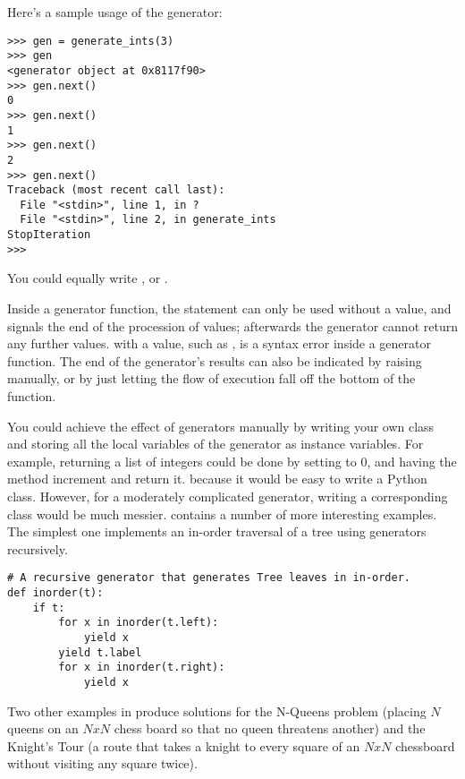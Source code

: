 \documentclass{howto}
\begin{document}
Here's a sample usage of the  generator:

\begin{verbatim}
>>> gen = generate_ints(3)
>>> gen
<generator object at 0x8117f90>
>>> gen.next()
0
>>> gen.next()
1
>>> gen.next()
2
>>> gen.next()
Traceback (most recent call last):
  File "<stdin>", line 1, in ?
  File "<stdin>", line 2, in generate_ints
StopIteration
>>>
\end{verbatim}

You could equally write , or
.

Inside a generator function, the  statement can only
be used without a value, and signals the end of the procession of
values; afterwards the generator cannot return any further values.
 with a value, such as , is a syntax
error inside a generator function.  The end of the generator's results
can also be indicated by raising  manually,
or by just letting the flow of execution fall off the bottom of the
function.

You could achieve the effect of generators manually by writing your
own class and storing all the local variables of the generator as
instance variables.  For example, returning a list of integers could
be done by setting  to 0, and having the
 method increment  and return it.
because it would be easy to write a Python class.  However, for a
moderately complicated generator, writing a corresponding class would
be much messier.   contains a number
of more interesting examples.  The simplest one implements an in-order
traversal of a tree using generators recursively.

\begin{verbatim}
# A recursive generator that generates Tree leaves in in-order.
def inorder(t):
    if t:
        for x in inorder(t.left):
            yield x
        yield t.label
        for x in inorder(t.right):
            yield x
\end{verbatim}

Two other examples in  produce
solutions for the N-Queens problem (placing $N$ queens on an $NxN$
chess board so that no queen threatens another) and the Knight's Tour
(a route that takes a knight to every square of an $NxN$ chessboard
without visiting any square twice). 
\end{document}

